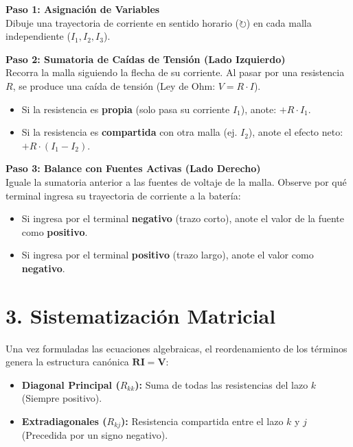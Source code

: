 \documentclass[11pt,a4paper]{article}
\begin{document}
\begin{tcolorbox}[colback=white,colframe=UCBblue,title=\textbf{Algoritmo Analítico de Lazo Cerrado}]
\textbf{Paso 1: Asignación de Variables} \\
Dibuje una trayectoria de corriente en sentido horario ($\circlearrowright$) en cada malla independiente ($I_1, I_2, I_3$).

\vspace{0.2cm}
\textbf{Paso 2: Sumatoria de Caídas de Tensión (Lado Izquierdo)} \\
Recorra la malla siguiendo la flecha de su corriente. Al pasar por una resistencia $R$, se produce una caída de tensión (Ley de Ohm: $V = R \cdot I$).
\begin{itemize}
    \item Si la resistencia es \textbf{propia} (solo pasa su corriente $I_1$), anote: $+ R \cdot I_1$.
    \item Si la resistencia es \textbf{compartida} con otra malla (ej. $I_2$), anote el efecto neto: $+ R \cdot (I_1 - I_2)$.
\end{itemize}

\vspace{0.2cm}
\textbf{Paso 3: Balance con Fuentes Activas (Lado Derecho)} \\
Iguale la sumatoria anterior a las fuentes de voltaje de la malla. Observe por qué terminal ingresa su trayectoria de corriente a la batería:
\begin{itemize}
    \item Si ingresa por el terminal \textbf{negativo} (trazo corto), anote el valor de la fuente como \textbf{positivo}.
    \item Si ingresa por el terminal \textbf{positivo} (trazo largo), anote el valor como \textbf{negativo}.
\end{itemize}
\end{tcolorbox}

\section*{3. Sistematización Matricial}
Una vez formuladas las ecuaciones algebraicas, el reordenamiento de los términos genera la estructura canónica $\mathbf{R}\mathbf{I} = \mathbf{V}$:
\begin{itemize}
    \item \textbf{Diagonal Principal ($R_{kk}$):} Suma de todas las resistencias del lazo $k$ (Siempre positivo).
    \item \textbf{Extradiagonales ($R_{kj}$):} Resistencia compartida entre el lazo $k$ y $j$ (Precedida por un signo negativo).
\end{itemize}
\end{document}

